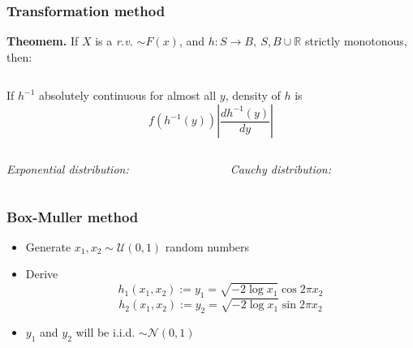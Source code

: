 \documentclass[10pt, serif, mathserif]{beamer}
\begin{document}
\begin{frame}
  \frametitle{Transformation method}
  \textbf{Theomem.} If $X$ is a \emph{r.v.} $\sim F(x)$, and $h : S \to B,\ S,B\cup \mathbb{R}$ strictly monotonous, then:
  \medskip
  \begin{columns}[t]
    \begin{column}{5cm}
      If $h^{-1}$ absolutely continuous for almost all $y$, density of $h$ is
      \[
        f(h^{-1}(y)) \left| \frac{dh^{-1}(y)}{dy}\right|
      \]
    \end{column}
  \end{columns}

  \bigskip
  
  \begin{columns}[t]
    \begin{column}{5cm}
      \centering \emph{Exponential distribution:}
    \end{column}

    \begin{column}{5cm}
      \centering \emph{Cauchy distribution:}
    \end{column}
  \end{columns}
\end{frame}

\begin{frame}
  \frametitle{Box-Muller method}
  \begin{itemize}
  	\item Generate $x_1, x_2 \sim \mathcal{U}(0,1)$ random numbers
  	\item Derive
  	  \[ h_1(x_1, x_2) := y_1 = \sqrt{-2 \log x_1} \cos{2\pi x_2} \]
  	  \[ h_2(x_1, x_2) := y_2 = \sqrt{-2 \log x_1} \sin{2\pi x_2} \] 
	\item $y_1$ and $y_2$ will be i.i.d. $\sim \mathcal{N}(0,1)$
  \end{itemize}
\end{frame}
\end{document}

